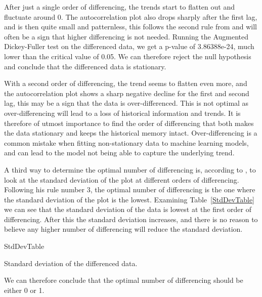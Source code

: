 After just a single order of differencing, the trends start to flatten out and fluctuate around 0. The autocorrelation plot also drops sharply after the first lag, and is then quite small and patternless, this follows the second rule from \textcite{nau_2019} and will often be a sign that higher differencing is not needed. Running the Augmented Dickey-Fuller test on the differenced data, we get a p-value of 3.86388e-24, much lower than the critical value of 0.05. We can therefore reject the null hypothesis and conclude that the differenced data is stationary. 

With a second order of differencing, the trend seems to flatten even more, and the autocorrelation plot shows a sharp negative decline for the first and second lag, this may be a sign that the data is over-differenced. This is not optimal as over-differencing will lead to a loss of historical information and trends. It is therefore of utmost importance to find the order of differencing that both makes the data stationary and keeps the historical memory intact. Over-differencing is a common mistake when fitting non-stationary data to machine learning models, and can lead to the model not being able to capture the underlying trend.~\parencite{lopezde_prado2018}

A third way to determine the optimal number of differencing is, according to \textcite{nau_2019}, to look at the standard deviation of the plot at different orders of differencing. Following his rule number 3, the optimal number of differencing is the one where the standard deviation of the plot is the lowest. Examining Table~\ref{StdDevTable} we can see that the standard deviation of the data is lowest at the first order of differencing. After this the standard deviation increases, and there is no reason to believe any higher number of differencing will reduce the standard deviation. 

\begin{table}[H]
    \begin{center}
        {StdDevTable}
        \caption{\label{StdDevTable}Standard deviation of the differenced data.}
    \end{center}
\end{table}

We can therefore conclude that the optimal number of differencing should be either 0 or 1.

